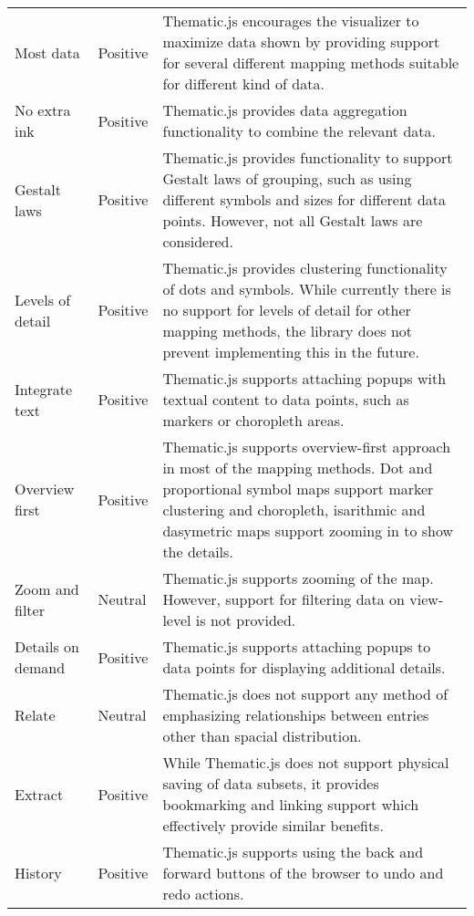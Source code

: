 \begin{longtable}{|p{3cm}|p{2.2cm}|p{7.8cm}|}
Most data & Positive & Thematic.js encourages the visualizer to maximize data shown by providing support for several different mapping methods suitable for different kind of data. \\[0.5em] %
No extra ink & Positive & Thematic.js provides data aggregation functionality to combine the relevant data. \\[0.5em] %
Gestalt laws & Positive & Thematic.js provides functionality to support Gestalt laws of grouping, such as using different symbols and sizes for different data points. However, not all Gestalt laws are considered. \\[0.5em] %
Levels of detail & Positive & Thematic.js provides clustering functionality of dots and symbols. While currently there is no support for levels of detail for other mapping methods, the library does not prevent implementing this in the future. \\[0.5em] %
Integrate text & Positive & Thematic.js supports attaching popups with textual content to data points, such as markers or choropleth areas. \\[0.5em]
Overview first & Positive & Thematic.js supports overview-first approach in most of the mapping methods. Dot and proportional symbol maps support marker clustering and choropleth, isarithmic and dasymetric maps support zooming in to show the details. \\[0.5em] %
Zoom and filter & Neutral & Thematic.js supports zooming of the map. However, support for filtering data on view-level is not provided. \\[0.5em]
Details on demand & Positive & Thematic.js supports attaching popups to data points for displaying additional details. \\[0.5em]
Relate & Neutral & Thematic.js does not support any method of emphasizing relationships between entries other than spacial distribution. \\[0.5em] %
Extract & Positive & While Thematic.js does not support physical saving of data subsets, it provides bookmarking and linking support which effectively provide similar benefits. \\[0.5em] %
History & Positive & Thematic.js supports using the back and forward buttons of the browser to undo and redo actions. \\[0.5em] %

\end{longtable}
